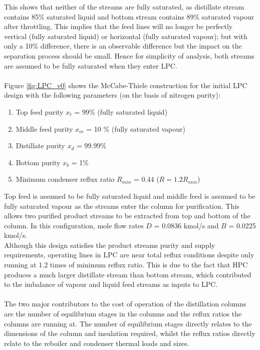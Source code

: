 \documentclass[11pt,oneside]{article}
\begin{document}
        \noindent This shows that neither of the streams are fully saturated, as distillate stream contains 85\% saturated liquid and bottom stream contains 89\% saturated vapour after throttling. This implies that the feed lines will no longer be perfectly vertical (fully saturated liquid) or horizontal (fully saturated vapour); but with only a 10\% difference, there is an observable difference but the impact on the separation process should be small. Hence for simplicity of analysis, both streams are assumed to be fully saturated when they enter LPC.\\
        \\
        Figure \ref{fig:LPC_v0} shows the McCabe-Thiele construction for the initial LPC design with the following parameters (on the basis of nitrogen purity):
        \begin{enumerate}
            \item Top feed purity $x_t$ = 99\% (fully saturated liquid)
            \item Middle feed purity $x_m$ = 10 \% (fully saturated vapour)
            \item Distillate purity $x_d$ = 99.99\%
            \item Bottom purity $x_b$ = 1\%
            \item Minimum condenser reflux ratio $R_{min}$ = 0.44 ($R = 1.2R_{min}$)
        \end{enumerate}
        Top feed is assumed to be fully saturated liquid and middle feed is assumed to be fully saturated vapour as the streams enter the column for purification. This allows two purified product streams to be extracted from top and bottom of the column. In this configuration, mole flow rates $D$ = 0.0836 kmol/s and $B$ = 0.0225 kmol/s. \\
        Although this design satisfies the product streams purity and supply requirements,  operating lines in LPC are near total reflux conditions despite only running at 1.2 times of minimum reflux ratio. This is due to the fact that HPC produces a much larger distillate stream than bottom stream, which contributed to the imbalance of vapour and liquid feed streams as inputs to LPC. \\
        \\
        The two major contributors to the cost of operation of the distillation columns are the number of equilibrium stages in the columns and the reflux ratios the columns are running at. The number of equilibrium stages directly relates to the dimensions of the column and insulation required, whilst the reflux ratios directly relate to the reboiler and condenser thermal loads and sizes. \\
\end{document}
